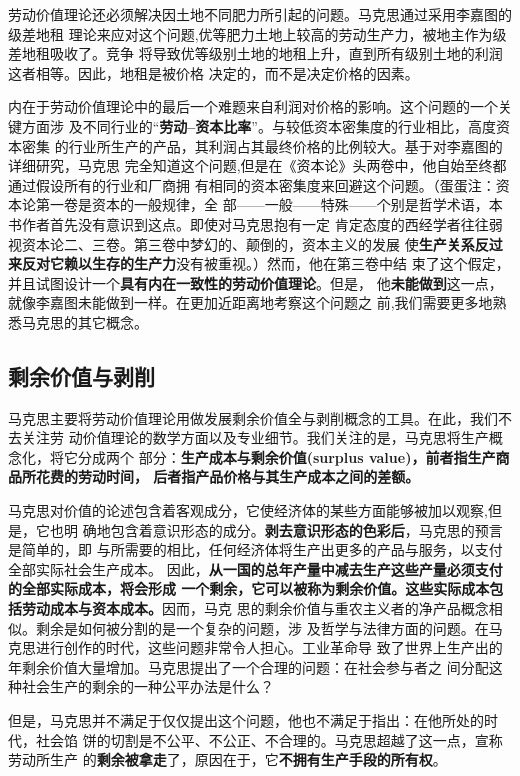 劳动价值理论还必须解决因土地不同肥力所引起的问题。马克思通过采用李嘉图的级差地租
理论来应对这个问题,优等肥力土地上较高的劳动生产力，被地主作为级差地租吸收了。竞争
将导致优等级别土地的地租上升，直到所有级别土地的利润这者相等。因此，地租是被价格
决定的，而不是决定价格的因素。

内在于劳动价值理论中的最后一个难题来自利润对价格的影响。这个问题的一个关键方面涉
及不同行业的“\textbf{劳动--资本比率}”。与较低资本密集度的行业相比，高度资本密集
的行业所生产的产品，其利润占其最终价格的比例较大。基于对李嘉图的详细研究，马克思
完全知道这个问题,但是在《资本论》头两卷中，他自始至终都通过假设所有的行业和厂商拥
有相同的资本密集度来回避这个问题。（蛋蛋注：资本论第一卷是资本的一般规律，全
部——一般——特殊——个别是哲学术语，本书作者首先没有意识到这点。即使对马克思抱有一定
肯定态度的西经学者往往弱视资本论二、三卷。第三卷中梦幻的、颠倒的，资本主义的发展
使\textbf{生产关系反过来反对它赖以生存的生产力}没有被重视。）然而，他在第三卷中结
束了这个假定，并且试图设计一个\textbf{具有内在一致性的劳动价值理论}。但是，
他\textbf{未能做到}这一点，就像李嘉图未能做到一样。在更加近距离地考察这个问题之
前,我们需要更多地熟悉马克思的其它概念。

\subsection{剩余价值与剥削}

马克思主要将劳动价值理论用做发展剩余价值全与剥削概念的工具。在此，我们不去关注劳
动价值理论的数学方面以及专业细节。我们关注的是，马克思将生产概念化，将它分成两个
部分：\textbf{生产成本与剩余价值(surplus value)，前者指生产商品所花费的劳动时间，
  后者指产品价格与其生产成本之间的差额。}

马克思对价值的论述包含着客观成分，它使经济体的某些方面能够被加以观察,但是，它也明
确地包含着意识形态的成分。\textbf{剥去意识形态的色彩后}，马克思的预言是简单的，即
与所需要的相比，任何经济体将生产出更多的产品与服务，以支付全部实际社会生产成本。
因此，\textbf{从一国的总年产量中减去生产这些产量必须支付的全部实际成本，将会形成
  一个剩余，它可以被称为剩余价值。这些实际成本包括劳动成本与资本成本。}因而，马克
思的剩余价值与重农主义者的净产品概念相似。剩余是如何被分割的是一个复杂的问题，涉
及哲学与法律方面的问题。在马克思进行创作的时代，这些问题非常令人担心。工业革命导
致了世界上生产出的年剩余价值大量增加。马克思提出了一个合理的问题：在社会参与者之
间分配这种社会生产的剩余的一种公平办法是什么？

但是，马克思并不满足于仅仅提出这个问题，他也不满足于指出：在他所处的时代，社会馅
饼的切割是不公平、不公正、不合理的。马克思超越了这一点，宣称劳动所生产
的\textbf{剩余被拿走}了，原因在于，它\textbf{不拥有生产手段的所有权}。

